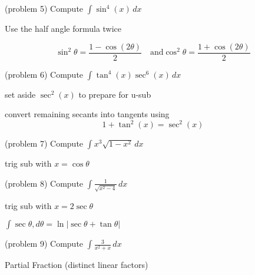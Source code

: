 \documentclass[handout]{ximera}
\begin{document}
\begin{problem}(problem 5)
Compute $\displaystyle \int \sin^4(x) \, dx$

\begin{hint}
Use the half angle formula twice

\[
\sin^2 \theta = \frac{1-\cos(2\theta)}{2} \quad \mbox{and}  \cos^2 \theta = \frac{1+\cos(2\theta)}{2}
\]
\end{hint}

\end{problem}

\begin{problem}(problem 6)
Compute $\displaystyle \int \tan^4(x) \sec^6(x) \, dx$

\begin{hint}
set aside $\sec^2(x)$ to prepare for u-sub
\end{hint}

\begin{hint}
convert remaining secants into tangents using
\[
1+ \tan^2(x) = \sec^2(x)
\]

\end{hint}
\end{problem}

\begin{problem}(problem 7)
Compute $\displaystyle \int x^3 \sqrt{1-x^2} \, dx$
\begin{hint}
trig sub with $x= \cos \theta$
\end{hint}

\end{problem}

\begin{problem}(problem 8)
Compute $\displaystyle \int \frac{1}{ \sqrt{x^2 - 4}} \, dx$
\begin{hint}
trig sub with $x= 2\sec \theta$
\end{hint}

\begin{hint}
 $\displaystyle \int \sec \theta, d \theta = \ln|\sec \theta + \tan \theta|$
\end{hint}

\end{problem}


\begin{problem}(problem 9)
Compute $\displaystyle \int \frac{3}{x^2 + x} \, dx$
\begin{hint}
Partial Fraction (distinct linear factors)
\end{hint}
\end{problem}
\end{document}

